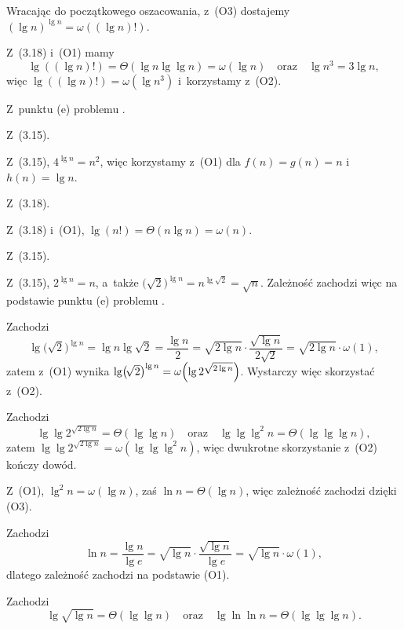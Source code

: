 \begin{description}[font=\textnormal, topsep=2ex, itemsep=2ex]
	Wracając do początkowego oszacowania, z~(O3) dostajemy $(\lg n)^{\lg n}=\omega((\lg n)!)$.
	\item[$(\lg n)!=\omega(n^3)$:]
	Z~(3.18) i~(O1) mamy
	\[
		\lg((\lg n)!) = \Theta(\lg n\lg\lg n) = \omega(\lg n) \quad\text{oraz}\quad \lg n^3 = 3\lg n,
	\]
	więc $\lg((\lg n)!)=\omega(\lg n^3)$ i~korzystamy z~(O2).
	\item[$n^3=\omega(n^2)$:]
	Z~punktu (e) problemu .
	\item[$n^2=\Theta\bigl(4^{\lg n}\bigr)$:]
	Z~(3.15).
	\item[$4^{\lg n}=\omega(n\lg n)$:]
	Z~(3.15), $4^{\lg n}=n^2$, więc korzystamy z~(O1) dla $f(n)=g(n)=n$ i~$h(n)=\lg n$.
	\item[$n\lg n=\Theta(\lg(n!))$:]
	Z~(3.18).
	\item[$\lg(n!)=\omega(n)$:]
	Z~(3.18) i~(O1), $\lg(n!)=\Theta(n\lg n)=\omega(n)$.
	\item[$n=\Theta\bigl(2^{\lg n}\bigr)$:]
	Z~(3.15).
	\item[$2^{\lg n}=\omega\bigl(\!\bigl(\!\sqrt{2}\bigr)^{\lg n}\bigr)$:]
	Z~(3.15), $2^{\lg n}=n$, a~także $\bigl(\!\sqrt{2}\bigr)^{\lg n}=n^{\lg\sqrt{2}}=\sqrt{n}$.
	Zależność zachodzi więc na podstawie punktu (e) problemu .
	\item[$\bigl(\!\sqrt{2}\bigr)^{\lg n}=\omega\Bigl(2^{\sqrt{2\lg n}}\Bigr)$:]
	Zachodzi
	\[
		\lg\bigl(\!\sqrt{2}\bigr)^{\lg n} = \lg n\lg\sqrt{2} = \frac{\lg n}{2} = \sqrt{2\lg n}\cdot\frac{\sqrt{\lg n}}{2\sqrt{2}} = \sqrt{2\lg n}\cdot\omega(1),
	\]
	zatem z~(O1) wynika $\lg\bigl(\!\sqrt{2}\bigr)^{\lg n}=\omega\Bigl(\lg2^{\sqrt{2\lg n}}\Bigr)$.
	Wystarczy więc skorzystać z~(O2).
	\item[$2^{\sqrt{2\lg n}}=\omega(\lg^2n)$:]
	Zachodzi
	\[
		\lg\lg2^{\sqrt{2\lg n}} = \Theta(\lg\lg n) \quad\text{oraz}\quad \lg\lg\lg^2n = \Theta(\lg\lg\lg n),
	\]
	zatem $\lg\lg2^{\sqrt{2\lg n}}=\omega(\lg\lg\lg^2n)$, więc dwukrotne skorzystanie z~(O2) kończy dowód.
	\item[$\lg^2n=\omega(\ln n)$:]
	Z~(O1), $\lg^2n=\omega(\lg n)$, zaś $\ln n=\Theta(\lg n)$, więc zależność zachodzi dzięki (O3).
	\item[$\ln n=\omega\bigl(\!\sqrt{\lg n}\bigr)$:]
	Zachodzi
	\[
		\ln n = \frac{\lg n}{\lg e} = \sqrt{\lg n}\cdot\frac{\sqrt{\lg n}}{\lg e} = \sqrt{\lg n}\cdot\omega(1),
	\]
	dlatego zależność zachodzi na podstawie (O1).
	\item[$\sqrt{\lg n}=\omega(\ln\ln n)$:]
	Zachodzi
	\[
		\lg\sqrt{\lg n} = \Theta(\lg\lg n) \quad\text{oraz}\quad \lg\ln\ln n = \Theta(\lg\lg\lg n).
\]
\end{description}
